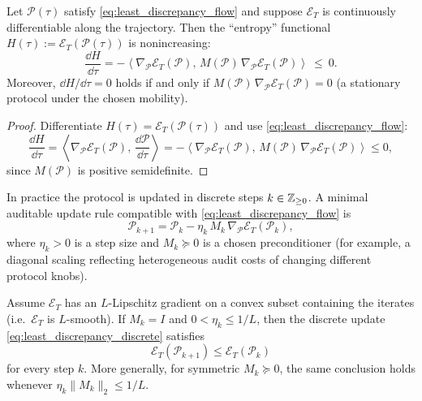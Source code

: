 \begin{proposition}
\label{prop:h_theorem_continuous}
Let $\mathcal{P}(\tau)$ satisfy \eqref{eq:least_discrepancy_flow} and suppose $\mathcal{E}_T$ is continuously differentiable along the trajectory.
Then the ``entropy'' functional $H(\tau):=\mathcal{E}_T(\mathcal{P}(\tau))$ is nonincreasing:
\[
\frac{\dd H}{\dd \tau}=-\left\langle \nabla_{\mathcal{P}}\mathcal{E}_T(\mathcal{P}),\,M(\mathcal{P})\,\nabla_{\mathcal{P}}\mathcal{E}_T(\mathcal{P})\right\rangle\ \le\ 0.
\]
Moreover, $\dd H/\dd\tau=0$ holds if and only if $M(\mathcal{P})\,\nabla_{\mathcal{P}}\mathcal{E}_T(\mathcal{P})=0$ (a stationary protocol under the chosen mobility).
\end{proposition}

\begin{proof}
Differentiate $H(\tau)=\mathcal{E}_T(\mathcal{P}(\tau))$ and use \eqref{eq:least_discrepancy_flow}:
\[
\frac{\dd H}{\dd \tau}
=\left\langle \nabla_{\mathcal{P}}\mathcal{E}_T(\mathcal{P}),\,\frac{\dd \mathcal{P}}{\dd\tau}\right\rangle
=-\left\langle \nabla_{\mathcal{P}}\mathcal{E}_T(\mathcal{P}),\,M(\mathcal{P})\,\nabla_{\mathcal{P}}\mathcal{E}_T(\mathcal{P})\right\rangle\le 0,
\]
since $M(\mathcal{P})$ is positive semidefinite.
\end{proof}

\begin{definition}
\label{def:least_discrepancy_discrete_update}
In practice the protocol is updated in discrete steps $k\in\mathbb{Z}_{\ge 0}$.
A minimal auditable update rule compatible with \eqref{eq:least_discrepancy_flow} is
\begin{equation}
\label{eq:least_discrepancy_discrete}
\mathcal{P}_{k+1}=\mathcal{P}_k-\eta_k\,M_k\,\nabla_{\mathcal{P}}\mathcal{E}_T(\mathcal{P}_k),
\end{equation}
where $\eta_k>0$ is a step size and $M_k\succeq 0$ is a chosen preconditioner (for example, a diagonal scaling reflecting heterogeneous audit costs of changing different protocol knobs).
\end{definition}

\begin{proposition}
\label{prop:h_theorem_discrete}
Assume $\mathcal{E}_T$ has an $L$-Lipschitz gradient on a convex subset containing the iterates (i.e.\ $\mathcal{E}_T$ is $L$-smooth).
If $M_k=I$ and $0<\eta_k\le 1/L$, then the discrete update \eqref{eq:least_discrepancy_discrete} satisfies
\[
\mathcal{E}_T(\mathcal{P}_{k+1})\le \mathcal{E}_T(\mathcal{P}_k)
\]
for every step $k$.
More generally, for symmetric $M_k\succeq 0$, the same conclusion holds whenever $\eta_k\|M_k\|_2\le 1/L$.
\end{proposition}

